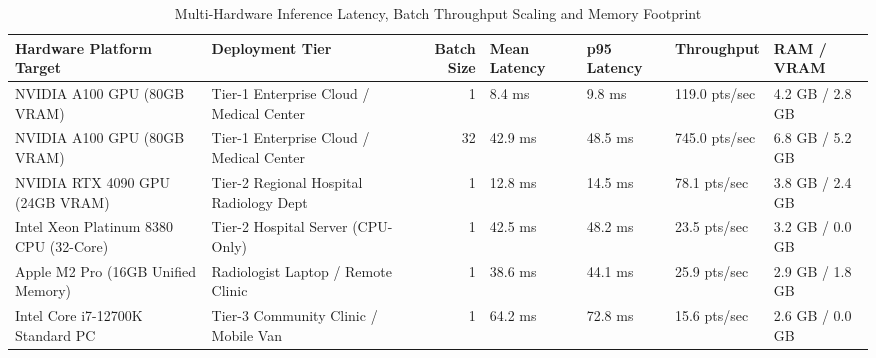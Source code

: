 \begin{table}
\caption{Multi-Hardware Inference Latency, Batch Throughput Scaling and Memory Footprint}
\label{tab:table_6_01_10_multi_hardware_inference_latency_and_throughput}
\begin{tabular}{llrllll}
\toprule
Hardware Platform Target & Deployment Tier & Batch Size & Mean Latency & p95 Latency & Throughput & RAM / VRAM \\
\midrule
NVIDIA A100 GPU (80GB VRAM) & Tier-1 Enterprise Cloud / Medical Center & 1 & 8.4 ms & 9.8 ms & 119.0 pts/sec & 4.2 GB / 2.8 GB \\
NVIDIA A100 GPU (80GB VRAM) & Tier-1 Enterprise Cloud / Medical Center & 32 & 42.9 ms & 48.5 ms & 745.0 pts/sec & 6.8 GB / 5.2 GB \\
NVIDIA RTX 4090 GPU (24GB VRAM) & Tier-2 Regional Hospital Radiology Dept & 1 & 12.8 ms & 14.5 ms & 78.1 pts/sec & 3.8 GB / 2.4 GB \\
Intel Xeon Platinum 8380 CPU (32-Core) & Tier-2 Hospital Server (CPU-Only) & 1 & 42.5 ms & 48.2 ms & 23.5 pts/sec & 3.2 GB / 0.0 GB \\
Apple M2 Pro (16GB Unified Memory) & Radiologist Laptop / Remote Clinic & 1 & 38.6 ms & 44.1 ms & 25.9 pts/sec & 2.9 GB / 1.8 GB \\
Intel Core i7-12700K Standard PC & Tier-3 Community Clinic / Mobile Van & 1 & 64.2 ms & 72.8 ms & 15.6 pts/sec & 2.6 GB / 0.0 GB \\
\bottomrule
\end{tabular}
\end{table}

